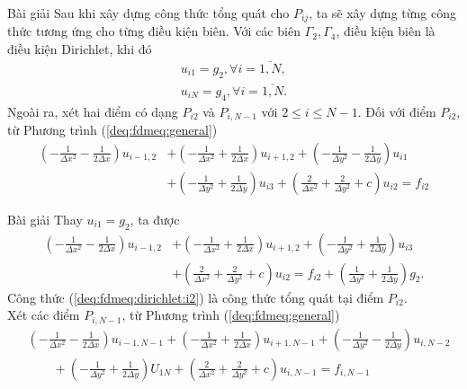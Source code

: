 \documentclass[9pt]{beamer}
\numberwithin{equation}{section}
\begin{document}
\begin{frame}
\begin{exampleblock}{Bài giải}
    Sau khi xây dựng công thức tổng quát cho $P_{ij}$, ta sẽ xây dựng từng công thức tương ứng cho từng điều kiện biên. Với các biên $\Gamma_2, \Gamma_4$, điều kiện biên là điều kiện Dirichlet, khi đó
    \begin{align*}
        u_{i1} = g_2, \forall i = \overline{1,N}, \\
        u_{iN} = g_4, \forall i = \overline{1,N}.
    \end{align*}
    Ngoài ra, xét hai điểm có dạng $P_{i2}$ và $P_{i,N-1}$ với $2 \le i \le N-1$. Đối với điểm $P_{i2}$, từ Phương trình (\ref{deq:fdmeq:general})
    \begin{align*}
        \left(-\frac{1}{\Delta x^2} - \frac{1}{2\Delta x}\right) u_{i-1,2} &+
        \left(-\frac{1}{\Delta x^2} + \frac{1}{2\Delta x}\right) u_{i+1,2} +
        \left(-\frac{1}{\Delta y^2} - \frac{1}{2\Delta y}\right) u_{i1} \\ &+
        \left(-\frac{1}{\Delta y^2} + \frac{1}{2\Delta y}\right) u_{i3} +
        \left(\frac{2}{\Delta x^2} + \frac{2}{\Delta y^2} + c\right) u_{i2}
        = f_{i2}
    \end{align*}
\end{exampleblock}
\end{frame}

\begin{frame}
\begin{exampleblock}{Bài giải}
    Thay $u_{i1} = g_2$, ta được
    \begin{align}
        \left(-\frac{1}{\Delta x^2} - \frac{1}{2\Delta x}\right) u_{i-1,2} &+
        \left(-\frac{1}{\Delta x^2} + \frac{1}{2\Delta x}\right) u_{i+1,2} +
        \left(-\frac{1}{\Delta y^2} + \frac{1}{2\Delta y}\right) u_{i3} \nonumber \\ &+
        \left(\frac{2}{\Delta x^2} + \frac{2}{\Delta y^2} + c\right) u_{i2}
        = f_{i2} + \left(\frac{1}{\Delta y^2} + \frac{1}{2\Delta y}\right) g_2. \label{deq:fdmeq:dirichlet:i2}
    \end{align}
    Công thức (\ref{deq:fdmeq:dirichlet:i2}) là công thức tổng quát tại điểm $P_{i2}$. \\

    Xét các điểm $P_{i,N-1}$, từ Phương trình (\ref{deq:fdmeq:general})
    \begin{align*}
        &\left(-\frac{1}{\Delta x^2} - \frac{1}{2\Delta x}\right) u_{i-1,N-1} +
        \left(-\frac{1}{\Delta x^2} + \frac{1}{2\Delta x}\right) u_{i+1,N-1} +
        \left(-\frac{1}{\Delta y^2} - \frac{1}{2\Delta y}\right) u_{i,N-2} \\ &\quad \quad +
        \left(-\frac{1}{\Delta y^2} + \frac{1}{2\Delta y}\right) U_{1N} +
        \left(\frac{2}{\Delta x^2} + \frac{2}{\Delta y^2} + c\right) u_{i,N-1} = f_{i,N-1}
    \end{align*}
\end{exampleblock}
\end{frame}
\end{document}

